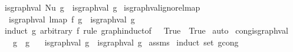 \begin{isabellebody}
{\isacharbar}{\kern0pt}\ {\isachardoublequoteopen}is{\isacharunderscore}{\kern0pt}graph{\isacharunderscore}{\kern0pt}val\ {\isacharparenleft}{\kern0pt}Nu\ g{\isacharparenright}{\kern0pt}\ {\isacharequal}{\kern0pt}\ is{\isacharunderscore}{\kern0pt}graph{\isacharunderscore}{\kern0pt}val\ g{\isachardoublequoteclose}\isanewline
\isanewline
\isanewline
\isanewline
{}\isamarkupfalse%
\ is{\isacharunderscore}{\kern0pt}graph{\isacharunderscore}{\kern0pt}val{\isacharunderscore}{\kern0pt}ignore{\isacharunderscore}{\kern0pt}lmap{\isacharcolon}{\kern0pt}\isanewline
\ \ {\isachardoublequoteopen}is{\isacharunderscore}{\kern0pt}graph{\isacharunderscore}{\kern0pt}val\ {\isacharparenleft}{\kern0pt}lmap\ f\ g{\isacharparenright}{\kern0pt}\ {\isacharequal}{\kern0pt}\ is{\isacharunderscore}{\kern0pt}graph{\isacharunderscore}{\kern0pt}val\ g{\isachardoublequoteclose}\isanewline
%
\isadelimproof
%
\endisadelimproof
%
\isatagproof
{}\isamarkupfalse%
\ {\isacharparenleft}{\kern0pt}induct\ g\ arbitrary{\isacharcolon}{\kern0pt}\ f\ rule{\isacharcolon}{\kern0pt}\ graph{\isachardot}{\kern0pt}induct{\isacharbrackleft}{\kern0pt}of\ {\isacharunderscore}{\kern0pt}\ {\isachardoublequoteopen}{\isacharpercent}{\kern0pt}{\isacharunderscore}{\kern0pt}{\isachardot}{\kern0pt}\ True{\isachardoublequoteclose}\ {\isachardoublequoteopen}{\isacharpercent}{\kern0pt}{\isacharunderscore}{\kern0pt}{\isachardot}{\kern0pt}\ True{\isachardoublequoteclose}{\isacharbrackright}{\kern0pt}{\isacharparenright}{\kern0pt}\isanewline
{}\isamarkupfalse%
\ auto%
\endisatagproof
{\isafoldproof}%
%
\isadelimproof
\isanewline
%
\endisadelimproof
\isanewline
\isanewline
{}\isamarkupfalse%
\ cong{\isacharunderscore}{\kern0pt}is{\isacharunderscore}{\kern0pt}graph{\isacharunderscore}{\kern0pt}val{\isacharcolon}{\kern0pt}\isanewline
\ \ \ {\isachardoublequoteopen}g{}\ {\isasymsimeq}\ g{}{\isachardoublequoteclose}\isanewline
\ \ \ {\isachardoublequoteopen}is{\isacharunderscore}{\kern0pt}graph{\isacharunderscore}{\kern0pt}val\ g{}\ {\isacharequal}{\kern0pt}\ is{\isacharunderscore}{\kern0pt}graph{\isacharunderscore}{\kern0pt}val\ g{}{\isachardoublequoteclose}\isanewline
%
\isadelimproof
%
\endisadelimproof
%
\isatagproof
{}\isamarkupfalse%
\ assms\isanewline
{}\isamarkupfalse%
\ {\isacharparenleft}{\kern0pt}induct\ set{\isacharcolon}{\kern0pt}\ gcong{\isacharparenright}{\kern0pt}\isanewline
{}\isamarkupfalse%

\end{isabellebody}
